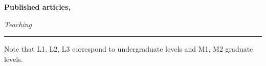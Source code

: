 \documentclass[a4paper,10pt]{article}
\begin{document}
	\textbf{Published articles,}
	\nocite{*}
	
	
	\vspace{5mm}
	
%	
%	
	
	
	
	
	\noindent
	\textit{\Large \color{MyGray} \hspace{5mm} Teaching}
	\vspace{2mm}
	{\color{DefaultGray}\hrule height .1pt}
	\vspace{5mm}
	
	Note that L1, L2, L3 correspond to undergraduate levels and M1, M2 graduate levels.
\end{document}
